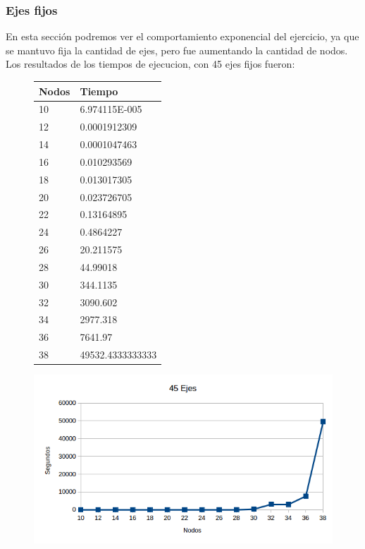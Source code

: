 \subsubsection{Ejes fijos}
En esta secci\'on podremos ver el comportamiento exponencial del ejercicio, ya que se mantuvo fija la cantidad de ejes, pero fue aumentando la cantidad de nodos.
Los resultados de los tiempos de ejecucion, con 45 ejes fijos fueron:\\
 \begin{figure}[h!]
   \begin{center}
\begin{tabular}{| l | l |}
\hline
 Nodos & Tiempo  \\ \hline
10 & 6.974115E-005 \\ \hline
12 & 0.0001912309 \\ \hline
14 & 0.0001047463 \\ \hline
16 & 0.010293569 \\ \hline
18 & 0.013017305 \\ \hline
20 & 0.023726705 \\ \hline
22 & 0.13164895 \\ \hline
24 & 0.4864227 \\ \hline
26 & 20.211575 \\ \hline
28 & 44.99018 \\ \hline
30 & 344.1135 \\ \hline
32 & 3090.602 \\ \hline
34 & 2977.318 \\ \hline
36 & 7641.97 \\ \hline
38 & 49532.4333333333 \\ \hline
\end{tabular}
   \end{center}
 \end{figure}


 \begin{figure}[h!]
   \begin{center}
 	\includegraphics[scale=0.7]{imagenes/exacto/45Ejes.png}
   \end{center}
 \end{figure}
 
